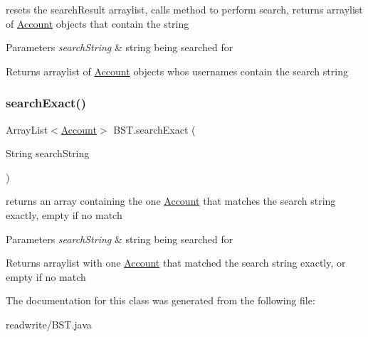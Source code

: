 resets the search\+Result arraylist, calls method to perform search, returns arraylist of \hyperlink{class_account}{Account} objects that contain the string 


\begin{DoxyParams}{Parameters}
{\em search\+String} & string being searched for \\
\hline
\end{DoxyParams}
\begin{DoxyReturn}{Returns}
arraylist of \hyperlink{class_account}{Account} objects who\textquotesingle{}s usernames contain the search string 
\end{DoxyReturn}
\mbox{\label{class_b_s_t_a1474f85085f916fcc3c31ed639467ba6}} 
\subsubsection{\texorpdfstring{search\+Exact()}{searchExact()}}
{\footnotesize\ttfamily Array\+List$<$\hyperlink{class_account}{Account}$>$ B\+S\+T.\+search\+Exact (\begin{DoxyParamCaption}\item[{String}]{search\+String }\end{DoxyParamCaption})}



returns an array containing the one \hyperlink{class_account}{Account} that matches the search string exactly, empty if no match 


\begin{DoxyParams}{Parameters}
{\em search\+String} & string being searched for \\
\hline
\end{DoxyParams}
\begin{DoxyReturn}{Returns}
arraylist with one \hyperlink{class_account}{Account} that matched the search string exactly, or empty if no match 
\end{DoxyReturn}


The documentation for this class was generated from the following file\+:\begin{DoxyCompactItemize}
\item 
readwrite/B\+S\+T.\+java\end{DoxyCompactItemize}
